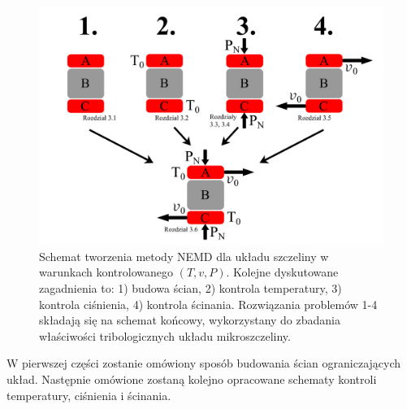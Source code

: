 \documentclass[12pt,a4paper,openright]{report} %
\begin{document}
\begin{figure}[h!]
\centering
\includegraphics[width=14cm, clip]{rysunki/metodologia_v2.pdf}
\caption{Schemat tworzenia metody NEMD dla układu szczeliny w warunkach kontrolowanego $(T, v, P)$. Kolejne dyskutowane zagadnienia to: 1) budowa ścian, 2) kontrola temperatury, 3) kontrola ciśnienia, 4) kontrola ścinania. Rozwiązania problemów 1-4 składają się na schemat końcowy, wykorzystany do zbadania właściwości tribologicznych układu mikroszczeliny.}
\label{metodologia}
\end{figure}
%
W pierwszej części zostanie omówiony sposób budowania ścian ograniczających układ. Następnie omówione zostaną kolejno opracowane schematy kontroli temperatury, ciśnienia i ścinania.
\end{document}
